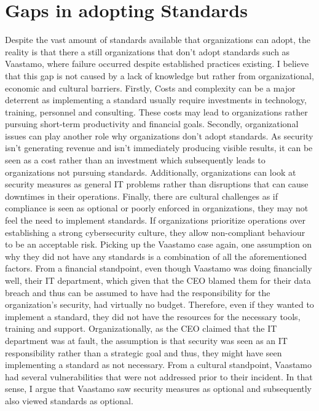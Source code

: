 \documentclass[12pt]{article}
\begin{document}
\section{Gaps in adopting Standards}
Despite the vast amount of standards available that organizations can adopt, the reality is that there a still organizations that don't adopt standards such as Vaastamo, where failure occurred despite established practices existing.
\newline
I believe that this gap is not caused by a lack of knowledge but rather from organizational, economic and cultural barriers. Firstly, Costs and complexity can be a major deterrent as implementing a standard usually require investments in technology, training, personnel and consulting. These costs may lead to organizations rather pursuing short-term productivity and financial goals.
\newline
Secondly, organizational issues can play another role why organizations don't adopt standards. As security isn't generating revenue and isn't immediately producing visible results, it can be seen as a cost rather than an investment which subsequently leads to organizations not pursuing standards. Additionally, organizations can look at security measures as general IT problems rather than disruptions that can cause downtimes in their operations.
\newline
Finally, there are cultural challenges as if compliance is seen as optional or poorly enforced in organizations, they may not feel the need to implement standards. If organizations prioritize operations over establishing a strong cybersecurity culture, they allow non-compliant behaviour to be an acceptable risk. 
\newline
Picking up the Vaastamo case again, one assumption on why they did not have any standards is a combination of all the aforementioned factors. 
\newline
From a financial standpoint, even though Vaastamo was doing financially well, their IT department, which given that the CEO blamed them for their data breach and thus can be assumed to have had the responsibility for the organization's security, had virtually no budget. Therefore, even if they wanted to implement a standard, they did not have the resources for the necessary tools, training and support. 
\newline 
Organizationally, as the CEO claimed that the IT department was at fault, the assumption is that security was seen as an IT responsibility rather than a strategic goal and thus, they might have seen implementing a standard as not necessary.
\newline
From a cultural standpoint, Vaastamo had several vulnerabilities that were not addressed prior to their incident. In that sense, I argue that Vaastamo saw security measures as optional and subsequently also viewed standards as optional.
\end{document}
